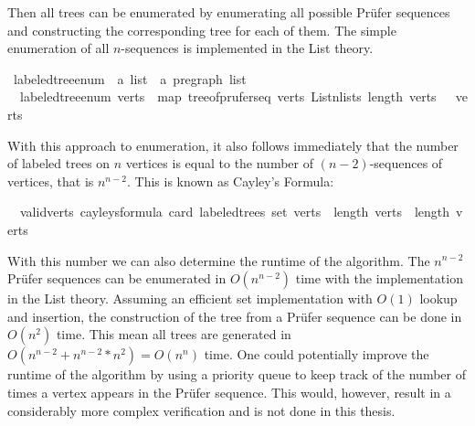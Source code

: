 Then all trees can be enumerated by enumerating all possible Prüfer sequences and constructing the corresponding tree for each of them.
The simple enumeration of all $n$-sequences is implemented in the List theory.

\begin{isabellebox}
    \isamarkupfalse%
    \ labeled{\isacharunderscore}{\kern0pt}tree{\isacharunderscore}{\kern0pt}enum\ {\isacharcolon}{\kern0pt}{\isacharcolon}{\kern0pt}\ {\isachardoublequoteopen}{\isacharprime}{\kern0pt}a\ list\ {\isasymRightarrow}\ {\isacharprime}{\kern0pt}a\ pregraph\ list{\isachardoublequoteclose}\ \isanewline
    \ \ {\isachardoublequoteopen}labeled{\isacharunderscore}{\kern0pt}tree{\isacharunderscore}{\kern0pt}enum\ verts\ {\isacharequal}{\kern0pt}\ map\ {\isacharparenleft}{\kern0pt}tree{\isacharunderscore}{\kern0pt}of{\isacharunderscore}{\kern0pt}prufer{\isacharunderscore}{\kern0pt}seq\ verts{\isacharparenright}{\kern0pt}\ {\isacharparenleft}{\kern0pt}List{\isachardot}{\kern0pt}n{\isacharunderscore}{\kern0pt}lists\ {\isacharparenleft}{\kern0pt}length\ verts\ {\isacharminus}{\kern0pt}\ {}{\isacharparenright}{\kern0pt}\ verts{\isacharparenright}{\kern0pt}{\isachardoublequoteclose}%
\end{isabellebox}

With this approach to enumeration, it also follows immediately that the number of labeled trees on $n$ vertices is equal to the number of $(n-2)$-sequences of vertices, that is $n^{n-2}$.
This is known as Cayley's Formula:

\begin{isabellebox}
    \isamarkupfalse%
    \ {\isacharparenleft}{\kern0pt}\ valid{\isacharunderscore}{\kern0pt}verts{\isacharparenright}{\kern0pt}\ cayleys{\isacharunderscore}{\kern0pt}formula{\isacharcolon}{\kern0pt}\ {\isachardoublequoteopen}card\ {\isacharparenleft}{\kern0pt}labeled{\isacharunderscore}{\kern0pt}trees\ {\isacharparenleft}{\kern0pt}set\ verts{\isacharparenright}{\kern0pt}{\isacharparenright}{\kern0pt}\ {\isacharequal}{\kern0pt}\ length\ verts\ {\isacharcircum}{\kern0pt}\ {\isacharparenleft}{\kern0pt}length\ verts\ {\isacharminus}{\kern0pt}\ {}{\isacharparenright}{\kern0pt}{\isachardoublequoteclose}
\end{isabellebox}

With this number we can also determine the runtime of the algorithm.
The $n^{n-2}$ Prüfer sequences can be enumerated in $O(n^{n-2})$ time with the implementation in the List theory.
Assuming an efficient set implementation with $O(1)$ lookup and insertion, the construction of the tree from a Prüfer sequence can be done in $O(n^2)$ time.
This mean all trees are generated in $O(n^{n-2} + n^{n-2} * n^2) = O(n^n)$ time.
One could potentially improve the runtime of the algorithm by using a priority queue to keep track of the number of times a vertex appears in the Prüfer sequence.
This would, however, result in a considerably more complex verification and is not done in this thesis.

